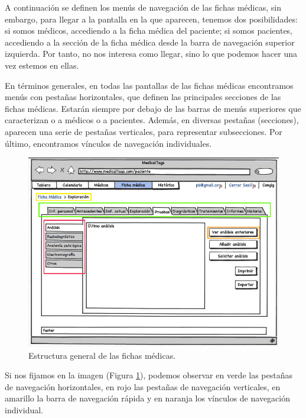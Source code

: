 		A continuación se definen los menús de navegación de las fichas médicas, sin embargo, para llegar a la pantalla en la que aparecen, tenemos dos posibilidades: si somos médicos, accediendo a la ficha médica del paciente; si somos pacientes, accediendo a la sección de la ficha médica desde la barra de navegación superior izquierda. Por tanto, no nos interesa como llegar, sino lo que podemos hacer una vez estemos en ellas. 
		
		En términos generales, en todas las pantallas de las fichas médicas encontramos menús con pestañas horizontales, que definen las principales secciones de las fichas médicas. Estarán siempre por debajo de las barras de menús superiores que caracterizan o a médicos o a pacientes. Además, en diversas pestañas (secciones), aparecen una serie de pestañas verticales, para representar subsecciones. Por último, encontramos vínculos de navegación individuales.
		
		\begin{figure}[H]
		  \centering
		    \includegraphics[width=15cm]{img/jpg/nav/fichamedica.jpg}
		  \caption{Estructura general de las fichas médicas.}
		  \label{fig:nav_ficha}
		\end{figure}
		
		Si nos fijamos en la imagen (Figura \ref{fig:nav_ficha}), podemos observar en verde las pestañas de navegación horizontales, en rojo las pestañas de navegación verticales, en amarillo la barra de navegación rápida y en naranja los vínculos de navegación individual.
		
